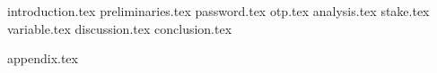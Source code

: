 {introduction.tex}
{preliminaries.tex}
{password.tex}
{otp.tex}
{analysis.tex}
{stake.tex}
{variable.tex}
{discussion.tex}
{conclusion.tex}

\appendix
{appendix.tex}
